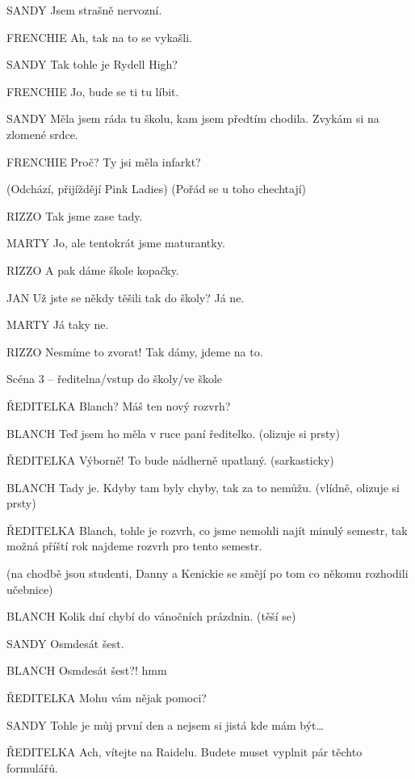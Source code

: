 SANDY                Jsem strašně nervozní.

FRENCHIE                Ah, tak na to se vykašli.

SANDY                Tak tohle je Rydell High?

FRENCHIE                Jo, bude se ti tu líbit.

SANDY                Měla jsem ráda tu školu, kam jsem předtím chodila. Zvykám si na                         zlomené srdce.

FRENCHIE                Proč? Ty jsi měla infarkt?

(Odchází, přijíždějí Pink Ladies) (Pořád se u toho chechtají)

RIZZO                Tak jsme zase tady.

MARTY                Jo, ale tentokrát jsme maturantky.

RIZZO                A pak dáme škole kopačky.

JAN                Už jste se někdy těšili tak do školy? Já ne.

MARTY                Já taky ne.

RIZZO                Nesmíme to zvorat! Tak dámy, jdeme na to.

Scéna 3 – ředitelna/vstup do školy/ve škole 

ŘEDITELKA                Blanch? Máš ten nový rozvrh?

BLANCH                 Teď jsem ho měla v ruce paní ředitelko. (olizuje si prsty)

ŘEDITELKA                 Výborně! To bude nádherně upatlaný. (sarkasticky)

BLANCH                Tady je. Kdyby tam byly chyby, tak za to nemůžu. (vlídně, olizuje si prsty)

ŘEDITELKA                Blanch, tohle je rozvrh, co jsme nemohli najít minulý semestr, tak                         možná příští rok najdeme rozvrh pro tento semestr.

(na chodbě jsou studenti, Danny a Kenickie se smějí po tom co někomu rozhodili učebnice)

BLANCH        Kolik dní chybí do vánočních prázdnin. (těší se)

SANDY        Osmdesát šest.

BLANCH        Osmdesát šest?! hmm

ŘEDITELKA        Mohu vám nějak pomoci?

SANDY        Tohle je můj první den a nejsem si jistá kde mám být…

ŘEDITELKA        Ach, vítejte na Raidelu. Budete muset vyplnit pár těchto formulářů.        

